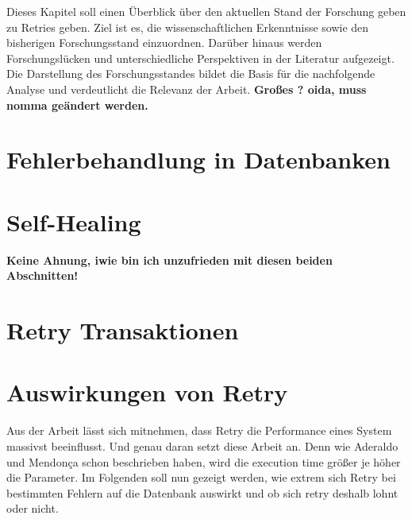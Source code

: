 
Dieses Kapitel soll einen Überblick über den aktuellen Stand der Forschung geben zu Retries geben.
Ziel ist es, die wissenschaftlichen Erkenntnisse sowie den bisherigen Forschungsstand einzuordnen.
Darüber hinaus werden Forschungslücken und unterschiedliche Perspektiven in der Literatur aufgezeigt.
Die Darstellung des Forschungsstandes bildet die Basis für die nachfolgende Analyse und verdeutlicht die Relevanz
der Arbeit.
\textbf{Großes ? oida, muss nomma geändert werden.}

\section{Fehlerbehandlung in Datenbanken}
\label{sec:errorhandling}


\section{Self-Healing}
\label{sec:selfHealing}


\textbf{Keine Ahnung, iwie bin ich unzufrieden mit diesen beiden Abschnitten!}

\section{Retry Transaktionen}
\label{sec:retryTransaction}


\section{Auswirkungen von Retry}
\label{sec:effectsOnSystem}


Aus der Arbeit lässt sich mitnehmen, dass Retry die Performance eines System massivst beeinflusst.
Und genau daran setzt diese Arbeit an.
Denn wie Aderaldo und Mendonça schon beschrieben haben, wird die execution time größer je höher die Parameter.
Im Folgenden soll nun gezeigt werden, wie extrem sich Retry bei bestimmten Fehlern auf die Datenbank auswirkt und ob
sich retry deshalb lohnt oder nicht.